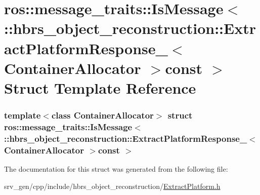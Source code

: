 \hypertarget{structros_1_1message__traits_1_1_is_message_3_01_1_1hbrs__object__reconstruction_1_1_extract_plad57760931949382cb72677cac0c8202f}{\section{ros\-:\-:message\-\_\-traits\-:\-:\-Is\-Message$<$ \-:\-:hbrs\-\_\-object\-\_\-reconstruction\-:\-:\-Extract\-Platform\-Response\-\_\-$<$ \-Container\-Allocator $>$const $>$ \-Struct \-Template \-Reference}
\label{structros_1_1message__traits_1_1_is_message_3_01_1_1hbrs__object__reconstruction_1_1_extract_plad57760931949382cb72677cac0c8202f}
}
\subsubsection*{template$<$class Container\-Allocator$>$ struct ros\-::message\-\_\-traits\-::\-Is\-Message$<$ \-::hbrs\-\_\-object\-\_\-reconstruction\-::\-Extract\-Platform\-Response\-\_\-$<$ Container\-Allocator $>$const  $>$}



\-The documentation for this struct was generated from the following file\-:\begin{DoxyCompactItemize}
\item 
srv\-\_\-gen/cpp/include/hbrs\-\_\-object\-\_\-reconstruction/\hyperlink{_extract_platform_8h}{\-Extract\-Platform.\-h}\end{DoxyCompactItemize}
